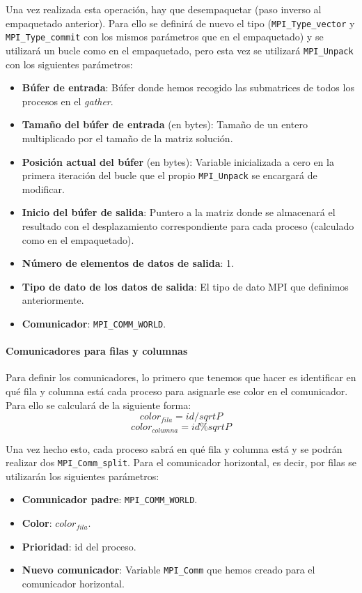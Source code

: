 Una vez realizada esta operación, hay que desempaquetar (paso inverso al empaquetado anterior). Para ello se definirá de nuevo el tipo (\texttt{MPI\_Type\_vector} y \texttt{MPI\_Type\_commit} con los mismos parámetros que en el empaquetado) y se utilizará un bucle como en el empaquetado, pero esta vez se utilizará \texttt{MPI\_Unpack} con los siguientes parámetros:
\begin{itemize}
	\item \textbf{Búfer de entrada}: Búfer donde hemos recogido las submatrices de todos los procesos en el \textit{gather}.
	\item \textbf{Tamaño del búfer de entrada} (en bytes): Tamaño de un entero multiplicado por el tamaño de la matriz solución.
	\item \textbf{Posición actual del búfer} (en bytes): Variable inicializada a cero en la primera iteración del bucle que el propio \texttt{MPI\_Unpack} se encargará de modificar.
	\item \textbf{Inicio del búfer de salida}: Puntero a la matriz donde se almacenará el resultado con el desplazamiento correspondiente para cada proceso (calculado como en el empaquetado).
	\item \textbf{Número de elementos de datos de salida}: 1.
	\item \textbf{Tipo de dato de los datos de salida}: El tipo de dato MPI que definimos anteriormente.
	\item \textbf{Comunicador}: \texttt{MPI\_COMM\_WORLD}.
\end{itemize}

\paragraph{Comunicadores para filas y columnas}

Para definir los comunicadores, lo primero que tenemos que hacer es identificar en qué fila y columna está cada proceso para asignarle ese color en el comunicador. Para ello se calculará de la siguiente forma:
\[ color_{fila} = id / sqrt{P} \]
\[ color_{columna} = id \% sqrt{P} \]

Una vez hecho esto, cada proceso sabrá en qué fila y columna está y se podrán realizar dos \texttt{MPI\_Comm\_split}. Para el comunicador horizontal, es decir, por filas se utilizarán los siguientes parámetros:
\begin{itemize}
	\item \textbf{Comunicador padre}: \texttt{MPI\_COMM\_WORLD}.
	\item \textbf{Color}: $ color_{fila} $.
	\item \textbf{Prioridad}: id del proceso.
	\item \textbf{Nuevo comunicador}: Variable \texttt{MPI\_Comm} que hemos creado para el comunicador horizontal.
\end{itemize}

